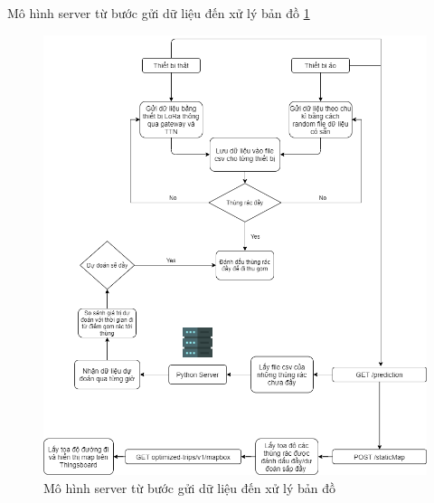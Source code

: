 Mô hình server từ bước gửi dữ liệu đến xử lý bản đồ \ref{fig:chart_server2}
\begin{figure}[H]
    \centering
    \includegraphics[width=\textwidth]{images/Khanh/Nodejs/Chart_server2.png}
    \caption{Mô hình server từ bước gửi dữ liệu đến xử lý bản đồ}
    \label{fig:chart_server2}
\end{figure}